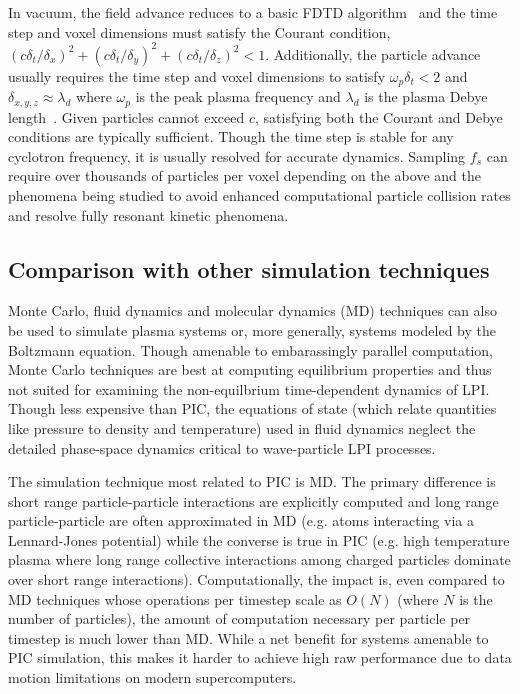 \documentclass[journal,twoside]{IEEEtran}
\begin{document}
In vacuum, the field advance reduces to a basic FDTD
algorithm~\cite{Yee_1966} and the time step and voxel dimensions must
satisfy the Courant condition, $\left(c\delta_t/\delta_x\right)^2 +
\left(c\delta_t/\delta_y\right)^2 + \left(c\delta_t/\delta_z\right)^2
< 1$.  Additionally, the particle advance usually requires the time
step and voxel dimensions to satisfy $\omega_p \delta_t < 2$ and
$\delta_{x,y,z} \approx \lambda_d$ where $\omega_p$ is the peak plasma
frequency and $\lambda_d$ is the plasma Debye
length~\cite{Birdsall_Langdon_1985,Hockney_Eastwood_1988}.  Given
particles cannot exceed $c$, satisfying both the Courant and Debye
conditions are typically sufficient.  Though the time step is stable
for any cyclotron frequency, it is usually resolved for accurate
dynamics.  Sampling $f_s$ can require over thousands of particles per
voxel depending on the above and the phenomena being studied to avoid
enhanced computational particle collision rates and resolve fully
resonant kinetic phenomena.

\subsection{Comparison with other simulation techniques}

Monte Carlo, fluid dynamics and molecular dynamics (MD) techniques can
also be used to simulate plasma systems or, more generally, systems
modeled by the Boltzmann equation.  Though amenable to embarassingly
parallel computation, Monte Carlo techniques are best at computing
equilibrium properties and thus not suited for examining the
non-equilbrium time-dependent dynamics of LPI.  Though less expensive
than PIC, the equations of state (which relate quantities like
pressure to density and temperature) used in fluid dynamics neglect
the detailed phase-space dynamics critical to wave-particle LPI
processes.

The simulation technique most related to PIC is MD.  The primary
difference is short range particle-particle interactions are
explicitly computed and long range particle-particle are often
approximated in MD (e.g. atoms interacting via a Lennard-Jones
potential) while the converse is true in PIC (e.g. high temperature
plasma where long range collective interactions among charged
particles dominate over short range interactions).  Computationally,
the impact is, even compared to MD techniques whose operations per
timestep scale as $O(N)$ (where $N$ is the number of particles), the
amount of computation necessary per particle per timestep is much
lower than MD.  While a net benefit for systems amenable to PIC
simulation, this makes it harder to achieve high raw performance due
to data motion limitations on modern supercomputers.
\end{document}
